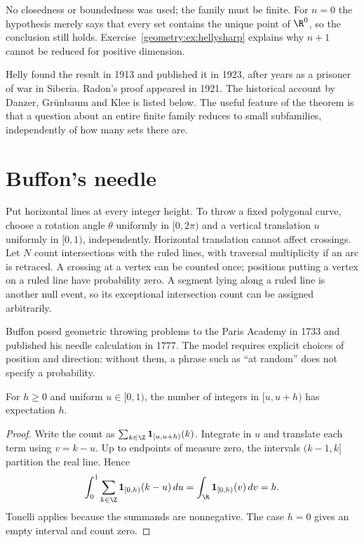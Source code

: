 No closedness or boundedness was used; the family must be finite. For $n=0$ the hypothesis merely says that every set contains the unique point of $\R^0$, so the conclusion still holds. Exercise~\ref{geometry:ex:hellysharp} explains why $n+1$ cannot be reduced for positive dimension.

Helly found the result in 1913 and published it in 1923, after years as a prisoner of war in Siberia. Radon's proof appeared in 1921. The historical account by Danzer, Gr\"unbaum and Klee is listed below. The useful feature of the theorem is that a question about an entire finite family reduces to small subfamilies, independently of how many sets there are.

\section{Buffon's needle}

Put horizontal lines at every integer height. To throw a fixed polygonal curve, choose a rotation angle $\theta$ uniformly in $[0,2\pi)$ and a vertical translation $u$ uniformly in $[0,1)$, independently. Horizontal translation cannot affect crossings. Let $N$ count intersections with the ruled lines, with traversal multiplicity if an arc is retraced. A crossing at a vertex can be counted once; positions putting a vertex on a ruled line have probability zero. A segment lying along a ruled line is another null event, so its exceptional intersection count can be assigned arbitrarily.

Buffon posed geometric throwing problems to the Paris Academy in 1733 and published his needle calculation in 1777. The model requires explicit choices of position and direction: without them, a phrase such as ``at random'' does not specify a probability.

\begin{lemma}\label{geometry:lem:randominterval}
For $h\ge0$ and uniform $u\in[0,1)$, the number of integers in $[u,u+h)$ has expectation $h$.
\end{lemma}

\begin{proof}
Write the count as $\sum_{k\in\Z}\mathbf1_{[u,u+h)}(k)$. Integrate in $u$ and translate each term using $v=k-u$. Up to endpoints of measure zero, the intervals $(k-1,k]$ partition the real line. Hence
\[
\int_0^1\sum_{k\in\Z}\mathbf1_{[0,h)}(k-u)\,du
=\int_{\R}\mathbf1_{[0,h)}(v)\,dv=h.
\]
Tonelli applies because the summands are nonnegative. The case $h=0$ gives an empty interval and count zero.
\end{proof}


